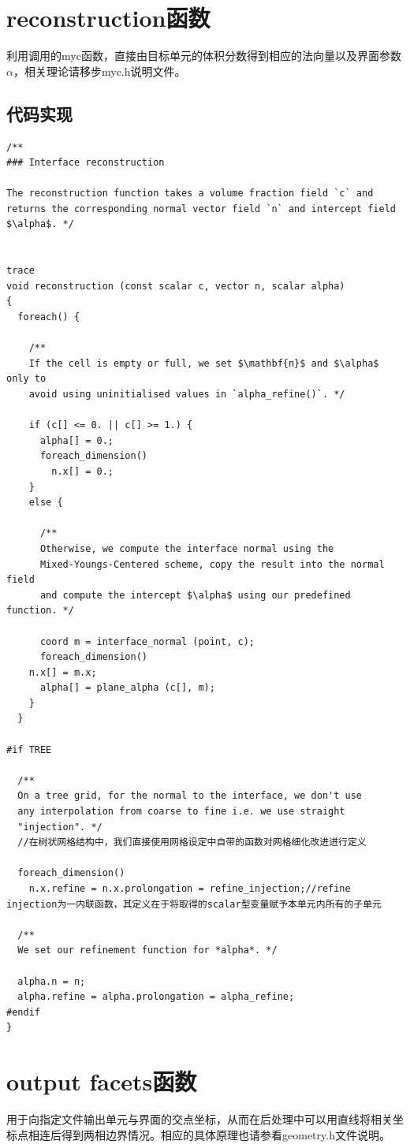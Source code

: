 \documentclass[lang=cn,11pt,a4paper]{elegantpaper}
\begin{document}
\section{reconstruction函数}\label{sec:reconstruction}
利用调用的myc函数，直接由目标单元的体积分数得到相应的法向量以及界面参数$\alpha$，相关理论请移步myc.h说明文件。
\subsection{代码实现}
\begin{verbatim}
/**
### Interface reconstruction 

The reconstruction function takes a volume fraction field `c` and
returns the corresponding normal vector field `n` and intercept field
$\alpha$. */


trace
void reconstruction (const scalar c, vector n, scalar alpha)
{
  foreach() {

    /**
    If the cell is empty or full, we set $\mathbf{n}$ and $\alpha$ only to
    avoid using uninitialised values in `alpha_refine()`. */

    if (c[] <= 0. || c[] >= 1.) {
      alpha[] = 0.;
      foreach_dimension()
        n.x[] = 0.;
    }
    else {

      /**
      Otherwise, we compute the interface normal using the
      Mixed-Youngs-Centered scheme, copy the result into the normal field
      and compute the intercept $\alpha$ using our predefined function. */

      coord m = interface_normal (point, c);
      foreach_dimension()
    n.x[] = m.x;
      alpha[] = plane_alpha (c[], m);
    }
  }

#if TREE

  /**
  On a tree grid, for the normal to the interface, we don't use
  any interpolation from coarse to fine i.e. we use straight
  "injection". */
  //在树状网格结构中，我们直接使用网格设定中自带的函数对网格细化改进进行定义

  foreach_dimension()
    n.x.refine = n.x.prolongation = refine_injection;//refine injection为一内联函数，其定义在于将取得的scalar型变量赋予本单元内所有的子单元

  /**
  We set our refinement function for *alpha*. */

  alpha.n = n;
  alpha.refine = alpha.prolongation = alpha_refine;
#endif
}
\end{verbatim}
\section{output facets函数}\label{sec:outputfacets}
用于向指定文件输出单元与界面的交点坐标，从而在后处理中可以用直线将相关坐标点相连后得到两相边界情况。相应的具体原理也请参看geometry.h文件说明。
\end{document}

